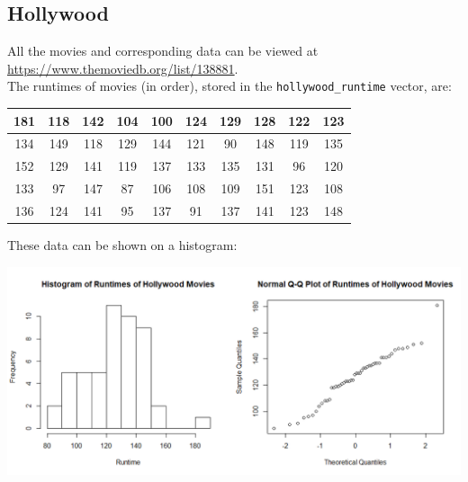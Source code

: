 \documentclass{article}
\begin{document}
\subsection{Hollywood}
\label{sec:hollywood}
All the movies and corresponding data can be viewed at \url{https://www.themoviedb.org/list/138881}.\\
The runtimes of movies (in order), stored in the \texttt{hollywood\_runtime} vector, are:
\begin{center}\begin{tabular}{ |c|c|c|c|c|c|c|c|c|c| }
\hline
181&118&142&104&100&124&129&128&122&123\\
\hline
134&149&118&129&144&121&90&148&119&135\\
\hline
152&129&141&119&137&133&135&131&96&120\\
\hline
133&97&147&87&106&108&109&151&123&108\\
\hline
136&124&141&95&137&91&137&141&123&148\\
\hline
\end{tabular}\end{center}
These data can be shown on a histogram:
\begin{center}
\includegraphics[scale=0.6]{hollywood_runtime.png}
\end{center}
\end{document}
